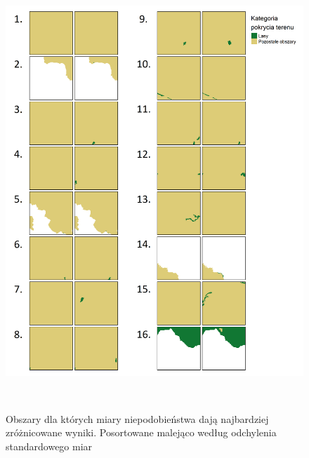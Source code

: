 \documentclass{amuthesis}
\begin{document}
\begin{figure}[t]

{\centering \includegraphics[width=5.20833in,height=6.47917in]{figures/obszary_odst_kopia.png}

}

\caption{\label{fig-obszary_odst}Obszary dla których miary
niepodobieństwa dają najbardziej zróżnicowane wyniki. Posortowane
malejąco według odchylenia standardowego miar}

\end{figure}
\end{document}
